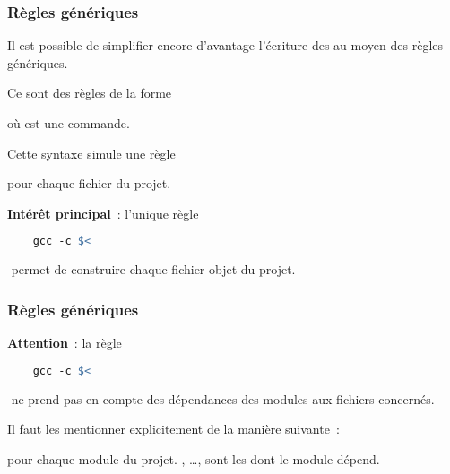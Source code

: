 \begin{frame}[fragile]
\frametitle{Règles génériques}
Il est possible de simplifier encore d'avantage l'écriture des 
au moyen des \alert{règles génériques}.
\medskip

Ce sont des règles de la forme
\smallskip

\smallskip

où  est une commande.
\medskip

Cette syntaxe simule une règle
\smallskip

\smallskip

pour chaque fichier  du projet.
\bigskip

{\bf Intérêt principal}~: l'unique règle
\begin{lstlisting}[language=make,numbers=none,basicstyle=\footnotesize\tt]
%.o: %.c
    gcc -c $<
\end{lstlisting}
\begin{math}\end{math}
permet de construire chaque fichier objet du projet.
\end{frame}

\begin{frame}[fragile]
\frametitle{Règles génériques}
{\bf Attention}~: la règle
\begin{lstlisting}[language=make,numbers=none,basicstyle=\footnotesize\tt]
%.o: %.c
    gcc -c $<
\end{lstlisting}%
\begin{math}\end{math}%
ne prend pas en compte des dépendances des modules aux fichiers 
concernés.
\bigskip

Il faut les mentionner explicitement de la manière suivante~:
\smallskip

\smallskip

pour chaque module  du projet. , \dots, 
sont les  dont le module  dépend.
\end{frame}

